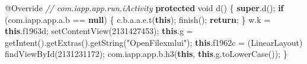 \documentclass[
]{article}
\newenvironment{Shaded}{}{}
\newcommand{\AttributeTok}[1]{\textcolor[rgb]{0.49,0.56,0.16}{#1}}
\newcommand{\CommentTok}[1]{\textcolor[rgb]{0.38,0.63,0.69}{\textit{#1}}}
\newcommand{\ControlFlowTok}[1]{\textcolor[rgb]{0.00,0.44,0.13}{\textbf{#1}}}
\newcommand{\DataTypeTok}[1]{\textcolor[rgb]{0.56,0.13,0.00}{#1}}
\newcommand{\DecValTok}[1]{\textcolor[rgb]{0.25,0.63,0.44}{#1}}
\newcommand{\FunctionTok}[1]{\textcolor[rgb]{0.02,0.16,0.49}{#1}}
\newcommand{\KeywordTok}[1]{\textcolor[rgb]{0.00,0.44,0.13}{\textbf{#1}}}
\newcommand{\NormalTok}[1]{#1}
\newcommand{\OperatorTok}[1]{\textcolor[rgb]{0.40,0.40,0.40}{#1}}
\newcommand{\StringTok}[1]{\textcolor[rgb]{0.25,0.44,0.63}{#1}}
\begin{document}
\begin{Shaded}
\begin{Highlighting}[]
    \AttributeTok{@Override} \CommentTok{// com.iapp.app.run.iActivity}
    \KeywordTok{protected} \DataTypeTok{void} \FunctionTok{d}\OperatorTok{()} \OperatorTok{\{}
        \KeywordTok{super}\OperatorTok{.}\FunctionTok{d}\OperatorTok{();}
        \ControlFlowTok{if} \OperatorTok{(}\NormalTok{com}\OperatorTok{.}\FunctionTok{iapp}\OperatorTok{.}\FunctionTok{app}\OperatorTok{.}\FunctionTok{a}\OperatorTok{.}\FunctionTok{b} \OperatorTok{==} \KeywordTok{null}\OperatorTok{)} \OperatorTok{\{}
\NormalTok{            c}\OperatorTok{.}\FunctionTok{b}\OperatorTok{.}\FunctionTok{a}\OperatorTok{.}\FunctionTok{a}\OperatorTok{.}\FunctionTok{e}\OperatorTok{.}\FunctionTok{t}\OperatorTok{(}\KeywordTok{this}\OperatorTok{);}
            \FunctionTok{finish}\OperatorTok{();}
            \ControlFlowTok{return}\OperatorTok{;}
        \OperatorTok{\}}
\NormalTok{        w}\OperatorTok{.}\FunctionTok{k} \OperatorTok{=} \KeywordTok{this}\OperatorTok{.}\FunctionTok{f1963d}\OperatorTok{;}
        \FunctionTok{setContentView}\OperatorTok{(}\DecValTok{2131427453}\OperatorTok{);}
        \KeywordTok{this}\OperatorTok{.}\FunctionTok{g} \OperatorTok{=} \FunctionTok{getIntent}\OperatorTok{().}\FunctionTok{getExtras}\OperatorTok{().}\FunctionTok{getString}\OperatorTok{(}\StringTok{"OpenFilexmlui"}\OperatorTok{);}
        \KeywordTok{this}\OperatorTok{.}\FunctionTok{f1962c} \OperatorTok{=} \OperatorTok{(}\NormalTok{LinearLayout}\OperatorTok{)} \FunctionTok{findViewById}\OperatorTok{(}\DecValTok{2131231172}\OperatorTok{);}
\NormalTok{        com}\OperatorTok{.}\FunctionTok{iapp}\OperatorTok{.}\FunctionTok{app}\OperatorTok{.}\FunctionTok{b}\OperatorTok{.}\FunctionTok{h3}\OperatorTok{(}\KeywordTok{this}\OperatorTok{,} \KeywordTok{this}\OperatorTok{.}\FunctionTok{g}\OperatorTok{.}\FunctionTok{toLowerCase}\OperatorTok{());}
    \OperatorTok{\}}


\end{Highlighting}
\end{Shaded}
\end{document}
